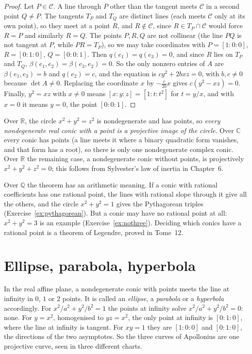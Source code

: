 \begin{proof}
Let $P\in\mathcal C$. A line through $P$ other than the tangent meets $\mathcal C$ in a second point $Q\ne P$. The tangents $T_P$ and $T_Q$ are distinct
lines (each meets $\mathcal C$ only at its own point), so they meet at a point $R$, and $R\notin\mathcal C$, since $R\in T_P\cap\mathcal C$ would force $R=P$
and similarly $R=Q$. The points $P,R,Q$ are not collinear (the line $PQ$ is not tangent at $P$, while $PR=T_P$), so we may take coordinates with
$P=[1:0:0]$, $R=[0:1:0]$, $Q=[0:0:1]$. Then $q(e_1)=q(e_3)=0$, and since $R$ lies on $T_P$ and $T_Q$, $\beta(e_1,e_2)=\beta(e_3,e_2)=0$. So the only
nonzero entries of $A$ are $\beta(e_1,e_3)=b$ and $q(e_2)=c$, and the equation is $cy^2+2bxz=0$, with $b,c\ne0$ because $\det A\ne0$. Replacing the
coordinate $x$ by $-\frac{c}{2b}x$ gives $c(y^2-xz)=0$. Finally, $y^2=xz$ with $x\ne0$ means $[x:y:z]=[1:t:t^2]$ for $t=y/x$, and with $x=0$ it means
$y=0$, the point $[0:0:1]$.
\end{proof}

Over $\mathbb R$, the circle $x^2+y^2=z^2$ is nondegenerate and has points, so \emph{every nondegenerate real conic with a point is a projective image
of the circle}. Over $\mathbb C$ every conic has points (a line meets it where a binary quadratic form vanishes, and that form has a root), so there is
only one nondegenerate complex conic. Over $\mathbb R$ the remaining case, a nondegenerate conic without points, is projectively $x^2+y^2+z^2=0$; this
follows from Sylvester's law of inertia in Chapter~6.

Over $\mathbb Q$ the theorem has an arithmetic meaning. If a conic with rational coefficients has one rational point, the lines with rational slope
through it give all the others, and the circle $x^2+y^2=1$ gives the Pythagorean triples (Exercise~\ref{ex:pythagorean}). But a conic may have no
rational point at all: $x^2+y^2=3$ is an example (Exercise~\ref{ex:nothree}). Deciding which conics have a rational point is a theorem of Legendre,
proved in Tome~12.

\section{Ellipse, parabola, hyperbola}

In the real affine plane, a nondegenerate conic with points meets the line at infinity in $0$, $1$ or $2$ points. It is called an \emph{ellipse}, a
\emph{parabola} or a \emph{hyperbola} accordingly. For $x^2/a^2+y^2/b^2=1$ the points at infinity solve $x^2/a^2+y^2/b^2=0$: none. For $y=x^2$,
homogenised to $yz=x^2$, the only point at infinity is $[0:1:0]$, where the line at infinity is tangent. For $xy=1$ they are $[1:0:0]$ and $[0:1:0]$,
the directions of the two asymptotes. So the three curves of Apollonius are one projective curve, seen in three different charts.

